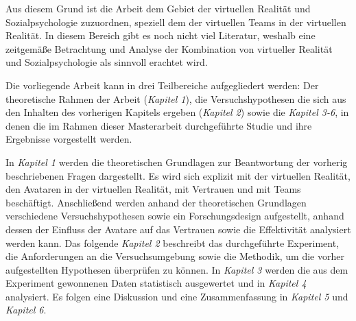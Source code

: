 \documentclass[a4paper,11pt]{article}%
\renewcommand{\\}{\vspace*{0.5\baselineskip} \newline}
\begin{document}
Aus diesem Grund ist die Arbeit dem Gebiet der virtuellen Realität und Sozialpsychologie zuzuordnen, speziell dem der virtuellen Teams in der virtuellen Realität.
In diesem Bereich gibt es noch nicht viel Literatur, weshalb eine zeitgemäße Betrachtung und Analyse der Kombination von virtueller Realität und Sozialpsychologie als sinnvoll erachtet wird.

Die vorliegende Arbeit kann in drei Teilbereiche aufgegliedert werden: Der theoretische Rahmen der Arbeit (\textit{Kapitel 1}), die Versuchshypothesen die sich aus den Inhalten des vorherigen Kapitels ergeben (\textit{Kapitel 2}) sowie die \textit{Kapitel 3-6}, in denen die im Rahmen dieser Masterarbeit durchgeführte Studie und ihre Ergebnisse vorgestellt werden.

In \textit{Kapitel 1} werden die theoretischen Grundlagen zur Beantwortung der vorherig beschriebenen Fragen dargestellt. Es wird sich explizit mit der virtuellen Realität, den Avataren in der virtuellen Realität, mit Vertrauen und mit Teams beschäftigt.
Anschließend werden anhand der theoretischen Grundlagen verschiedene Versuchshypothesen sowie ein Forschungsdesign aufgestellt, anhand dessen der Einfluss der Avatare auf das Vertrauen sowie die Effektivität analysiert werden kann.
Das folgende \textit{Kapitel 2} beschreibt das durchgeführte Experiment, die Anforderungen an die Versuchsumgebung sowie die Methodik, um die vorher aufgestellten Hypothesen überprüfen zu können. 
In \textit{Kapitel 3} werden die aus dem Experiment gewonnenen Daten statistisch ausgewertet und in \textit{Kapitel 4} analysiert.
Es folgen eine Diskussion und eine Zusammenfassung in \textit{Kapitel 5} und \textit{Kapitel 6}.
\end{document}
